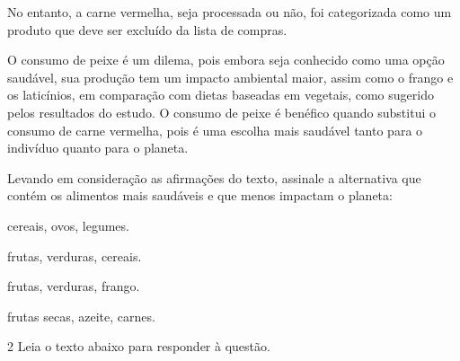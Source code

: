 \begin{myquote}
No entanto, a carne vermelha, seja processada ou não, foi categorizada como um
produto que deve ser excluído da lista de compras.

O consumo de peixe é um dilema, pois embora seja conhecido como uma opção
saudável, sua produção tem um impacto ambiental maior, assim como o frango e
os laticínios, em comparação com dietas baseadas em vegetais, como sugerido
pelos resultados do estudo. O consumo de
peixe é benéfico quando substitui o consumo de carne vermelha, pois é uma
escolha mais saudável tanto para o indivíduo quanto para o planeta.


\end{myquote}

Levando em consideração as afirmações do texto, assinale a alternativa que contém os alimentos
mais saudáveis e que menos impactam o planeta:

\begin{escolha}
  
    \item cereais, ovos, legumes.
  
    \item frutas, verduras, cereais.
  
    \item frutas, verduras, frango.
  
    \item frutas secas, azeite, carnes.

\end{escolha}

\num{2} Leia o texto abaixo para responder à questão. 

